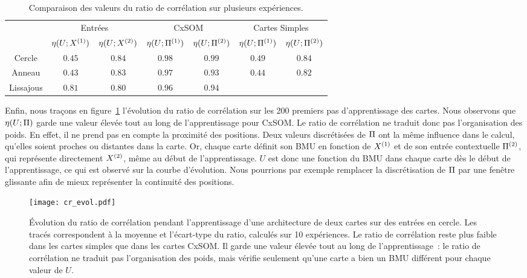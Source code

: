 \documentclass[../main]{subfiles}
\begin{document}
\begin{table}
    \centering
    \caption{Comparaison des valeurs du ratio de corrélation sur plusieurs expériences.\label{tab:eta}}
    \begin{tabular}{*7c}
        \toprule
        & \multicolumn{2}{c}{Entrées} & \multicolumn{2}{c}{CxSOM} & \multicolumn{2}{c}{Cartes Simples} \\
        \cmidrule(lr){2-7}
         & $\eta(U;X^{({1})})$ & $\eta(U;X^{({2})})$  & $\eta(U;\Pi^{({1})})$ & $\eta(U;\Pi^{({2})})$  & $\eta(U;\Pi^{({1})})$ & $\eta(U;\Pi^{({2})})$ \\    
        \midrule
        Cercle &   $0.45 $    & $0.84$  &  $0.98$ & $0.99$ & $0.49$ & $0.84$      \\
        Anneau &  $0.43$      &  $0.83$      & $0.97$ & $0.93$ & $0.44$ & $0.82$ \\
        Lissajous &  $0.81$     &  $0.80$ & $0.96$ & $0.94$  & & \\
        \bottomrule
    \end{tabular}
\end{table}

Enfin, nous traçons en figure~\ref{fig:cr_evol} l'évolution du ratio de corrélation sur les 200 premiers pas d'apprentissage des cartes. 
Nous observons que $\eta(U;\Pi)$ garde une valeur élevée tout au long de l'apprentissage pour CxSOM.
Le ratio de corrélation ne traduit donc pas l'organisation des poids.
En effet, il ne prend pas en compte la proximité des positions. Deux valeurs discrétisées de $\Pi$ ont la même influence dans le calcul, qu'elles soient proches ou distantes dans la carte.
Or, chaque carte définit son BMU en fonction de $X^{({1})}$ et de son entrée contextuelle $\Pi^{({2})}$, qui représente directement $X^{({2})}$, même au début de l'apprentissage. $U$ est donc une fonction du BMU dans chaque carte dès le début de l'apprentissage, ce qui est observé sur la courbe d'évolution.
Nous pourrions par exemple remplacer la discrétisation de $\Pi$ par une fenêtre glissante afin de mieux représenter la continuité des positions.

\begin{figure}
    \texttt{[image: cr\_evol.pdf]}
    \caption{\'Evolution du ratio de corrélation pendant l'apprentissage d'une architecture de deux cartes sur des entrées en cercle. Les tracés correspondent à la moyenne et l'écart-type du ratio, calculés sur 10 expériences. Le ratio de corrélation reste plus faible dans les cartes simples que dans les cartes CxSOM. Il garde une valeur élevée tout au long de l'apprentissage~: le ratio de corrélation ne traduit pas l'organisation des poids, mais vérifie seulement qu'une carte a bien un BMU différent pour chaque valeur de $U$. \label{fig:cr_evol}}
\end{figure}
\end{document}
